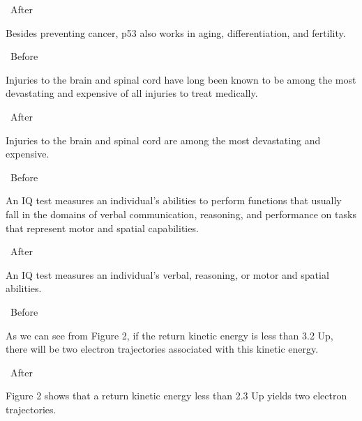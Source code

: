 \documentclass[a4paper,12pt]{article}
\begin{document}
\par\textbullet\ After
\par Besides preventing cancer, p53 also works in aging, differentiation, and fertility.

\par\textbullet\ Before
\par Injuries to the brain and spinal cord have long been known to be among the most devastating and expensive of all injuries to treat medically.

\par\textbullet\ After
\par Injuries to the brain and spinal cord are among the most devastating and expensive.

\par\textbullet\ Before
\par An IQ test measures an individual’s abilities to perform functions that usually fall in the domains of verbal communication, reasoning, and performance on tasks that represent motor and spatial capabilities.

\par\textbullet\ After
\par An IQ test measures an individual's verbal, reasoning, or motor and spatial abilities.

\par\textbullet\ Before
\par As we can see from Figure 2, if the return kinetic energy is less than 3.2 Up, there will be two electron trajectories associated with this kinetic energy.

\par\textbullet\ After
\par Figure 2 shows that a return kinetic energy less than 2.3 Up yields two electron trajectories.
\end{document}
